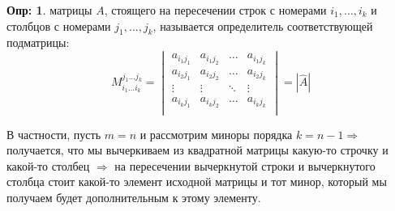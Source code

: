 \documentclass[12pt]{article}
\theoremstyle{definition}
\newtheorem{defn}{Опр:}
\newcommand{\wht}[1]{\widehat{#1}}
\begin{document}
\begin{defn}
	 матрицы $A$, стоящего на пересечении строк с номерами $i_1,\dotsc,i_k$ и столбцов с номерами $j_1,\dotsc, j_k$, называется определитель соответствующей подматрицы:
	$$
		M_{i_1 \dotsc i_k}^{j_1 \dotsc j_k} = 
		\begin{vmatrix}
			a_{i_1 j_1} & a_{i_1 j_2} & \dotsc & a_{i_1 j_k}\\
			a_{i_2 j_1} & a_{i_2 j_2} & \dotsc & a_{i_2 j_k}\\
			\vdots & \vdots & \ddots & \vdots\\
			a_{i_k j_1} & a_{i_k j_2} & \dotsc & a_{i_k j_k}\\
		\end{vmatrix} = |\wht{A}|
	$$
\end{defn}

В частности, пусть $m = n$ и рассмотрим миноры порядка $k = n-1 \Rightarrow$ получается, что мы вычеркиваем из квадратной матрицы какую-то строчку и какой-то столбец $\Rightarrow$ на пересечении вычеркнутой строки и вычеркнутого столбца стоит какой-то элемент исходной матрицы и тот минор, который мы получаем будет дополнительным к этому элементу.
\end{document}

